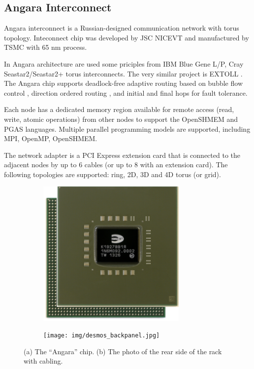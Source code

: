 \documentclass{llncs}
\begin{document}
\subsection{Angara Interconnect}

Angara interconnect is a Russian-designed communication network with torus topology. Inteconnect chip was developed by JSC NICEVT and manufactured by TSMC with 65 nm process. 

In Angara architecture are used some priciples from IBM Blue Gene L/P, Cray Seastar2/Seastar2+ torus interconnects. The very similar project is EXTOLL \cite{HPCA-2015-NeuwirthFNB}.
The Angara chip supports deadlock-free adaptive routing based on bubble flow control \cite{Puente:1999:ABR:850940.852882},  direction ordered routing \cite{Adiga:2005:BGT:1665957.1665963}, \cite{Scott96thecray} and initial and final hops \cite{Scott96thecray} for fault tolerance.

Each node has a dedicated memory region available for remote access (read, write, atomic operations) from other nodes to support the OpenSHMEM and PGAS languages. Multiple parallel programming models are supported, including MPI, OpenMP, OpenSHMEM.

The network adapter is a PCI Express extension card that is connected to the adjacent nodes by up to 6 cables (or up to 8 with an extension card). The following topologies are supported: ring, 2D, 3D and 4D torus (or grid). 

\begin{figure}[h!]
\centering
   \begin{subfigure}{0.48\textwidth}
    \includegraphics[width=0.8\textwidth]{img/angara_chip.png}\caption{}
   \end{subfigure}
   \begin{subfigure}{0.48\textwidth}
    \texttt{[image: img/desmos\_backpanel.jpg]}\caption{}
   \end{subfigure}
\caption{(a) The ``Angara'' chip. (b) The photo of the rear side of the rack with cabling.}
\end{figure}
\end{document}
